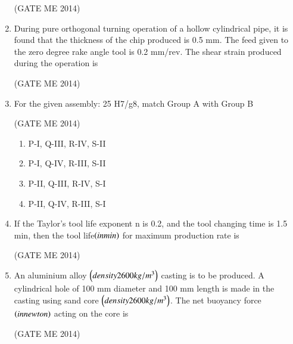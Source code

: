 \documentclass[journal]{IEEEtran}
\numberwithin{equation}{enumi}
\numberwithin{figure}{enumi}
\begin{document}
\begin{enumerate}
 \hfill{(GATE ME 2014)}
 
\item During pure orthogonal turning operation of a hollow cylindrical pipe, it is found that the thickness
of the chip produced is 0.5 mm. The feed given to the zero degree rake angle tool is 0.2 mm/rev.
The shear strain produced during the operation is

 \hfill{(GATE ME 2014)}

\item For the given assembly: 25 H7/g8, match Group A with Group B

\hfill{(GATE ME 2014)}

\begin{enumerate}
    \item P-I, Q-III, R-IV, S-II
    \item P-I, Q-IV, R-III, S-II
    \item P-II, Q-III, R-IV, S-I
\item  P-II, Q-IV, R-III, S-I
\end{enumerate}
 
\item 
If the Taylor's tool life exponent n is 0.2, and the tool changing time is 1.5 min, then the tool life$\left(in min\right)$ for maximum production rate is 

 \hfill{(GATE ME 2014)}
 
\item An aluminium alloy $\left(density 2600 kg/m^3\right)$ casting is to be produced. A cylindrical hole of 100 mm
diameter and 100 mm length is made in the casting using sand core $\left(density 2600 kg/m^3\right)$. The net
buoyancy force $\left(in newton\right)$ acting on the core is

 \hfill{(GATE ME 2014)}
\end{enumerate}
\end{document}
